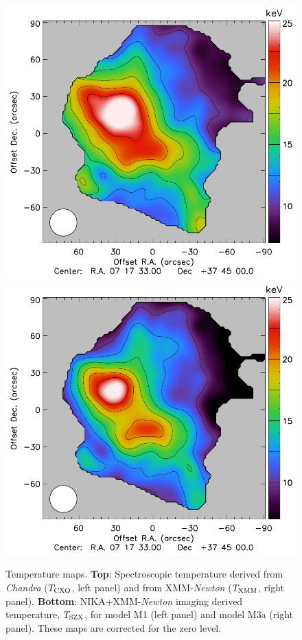 \documentclass[twocolumn,traditabstract]{aa}
\def\TSZ {T_{\rm SZX}}
\def \TXC {T_{\rm CXO}}
\def \TXX {T_{\rm XMM}}
\begin{document}
\begin{figure}[h]
\includegraphics[trim=0cm 0cm 1.4cm 0cm, clip=true, totalheight=7.6cm]{Figure/Thermo_TSZclean1.pdf}
\includegraphics[trim=0cm 0cm 0cm 0cm, clip=true, totalheight=7.6cm]{Figure/Thermo_TSZclean8.pdf}
\caption{\footnotesize{Temperature maps. {\bf Top}: Spectroscopic temperature derived from \textit{Chandra} ($\TXC$, left panel) and from XMM-\textit{Newton} ($\TXX$, right panel). {\bf Bottom}: NIKA+XMM-\textit{Newton} imaging derived temperature, $\TSZ$, for model M1 (left panel) and model M3a (right panel). These maps are corrected for the zero level.}}
\label{fig:T_maps}
\end{figure}
\end{document}
